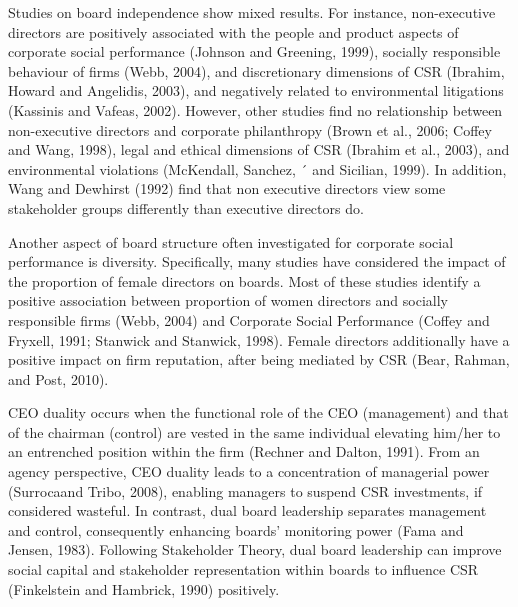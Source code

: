 \documentclass[
]{mitthesis}
\begin{document}
Studies on board independence show mixed results. For instance, non-executive directors are positively associated with the people and product aspects of corporate social performance (Johnson and Greening, 1999), socially responsible behaviour of firms (Webb, 2004), and discretionary dimensions of CSR (Ibrahim, Howard and Angelidis, 2003), and negatively related to environmental litigations (Kassinis and Vafeas, 2002). However, other studies find no relationship between non-executive directors and corporate philanthropy (Brown et al., 2006; Coffey and Wang, 1998), legal and ethical dimensions of CSR (Ibrahim et al., 2003), and environmental violations (McKendall, Sanchez, ´ and Sicilian, 1999). In addition, Wang and Dewhirst (1992) find that non executive directors view some stakeholder groups differently than executive directors do.

Another aspect of board structure often investigated for corporate social performance is diversity. Specifically, many studies have considered the impact of the proportion of female directors on boards. Most of these studies identify a positive association between proportion of women directors and socially responsible firms (Webb, 2004) and Corporate Social Performance (Coffey and Fryxell, 1991; Stanwick and Stanwick, 1998). Female directors additionally have a positive impact on firm reputation, after being mediated by CSR (Bear, Rahman, and Post, 2010).

CEO duality occurs when the functional role of the CEO (management) and that of the chairman (control) are vested in the same individual elevating him/her to an entrenched position within the firm (Rechner and Dalton, 1991). From an agency perspective, CEO duality leads to a concentration of managerial power (Surrocaand Tribo, 2008), enabling managers to suspend CSR investments, if considered wasteful. In contrast, dual board leadership separates management and control, consequently enhancing boards' monitoring power (Fama and Jensen, 1983). Following Stakeholder Theory, dual board leadership can improve social capital and stakeholder representation within boards to influence CSR (Finkelstein and Hambrick, 1990) positively.
\end{document}
